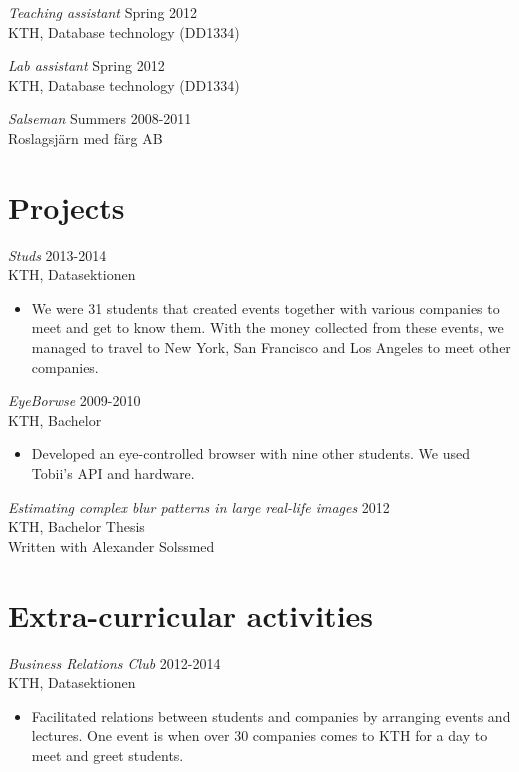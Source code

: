 \documentclass[margin, 10pt]{res} %
\begin{document}
\begin{resume}
{\sl Teaching assistant} \hfill Spring 2012 \\
KTH, Database technology (DD1334)

{\sl Lab assistant} \hfill Spring 2012 \\
KTH, Database technology (DD1334)

{\sl Salseman} \hfill Summers 2008-2011 \\
Roslagsjärn med färg AB


\section{Projects}

{\sl Studs} \hfill 2013-2014 \\
KTH, Datasektionen
\begin{itemize} 
\item We were 31 students that created events together with various companies to meet and get to know them. With the money collected from these events, we managed to travel to New York, San Francisco and Los Angeles to meet other companies.
\end{itemize} 

{\sl EyeBorwse} \hfill 2009-2010 \\
KTH, Bachelor
\begin{itemize} 
\item Developed an eye-controlled browser with nine other students. We used Tobii’s API and hardware.
\end{itemize} 

{\sl Estimating complex blur patterns in large real-life images} \hfill 2012 \\
KTH, Bachelor Thesis \\
Written with Alexander Solssmed



\section{Extra-curricular activities}

{\sl Business Relations Club} \hfill 2012-2014 \\
KTH, Datasektionen
\begin{itemize} 
\item Facilitated relations between students and companies by arranging events and lectures. One event is when over 30 companies comes to KTH for a day to meet and greet students.
\end{itemize}


\end{resume}
\end{document}
